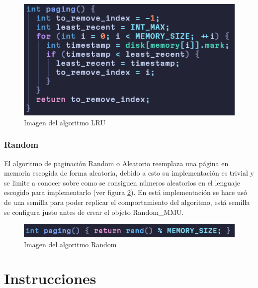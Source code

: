 \documentclass{report}
\begin{document}
\begin{figure}[h]
	\centering
	\includegraphics[width=0.8\linewidth]{figuras/lru.png}
	\caption{Imagen del algoritmo LRU }
	\label{fig:lru}
\end{figure}
  

\subsection{Random}

El algoritmo de paginación Random o Aleatorio reemplaza una página en memoria escogida de forma aleatoria, debido a esto su implementación es trivial y se limite a conocer sobre como se consiguen números aleatorios en el lenguaje escogido para implementarlo (ver figura \ref{fig:random}). En está implementación se hace usó de una semilla para poder replicar el comportamiento del algoritmo, está semilla se configura justo antes de crear el objeto Random\_MMU.

\begin{figure}[h]
	\centering
	\includegraphics[width=0.8\linewidth]{figuras/random.png}
	\caption{Imagen del algoritmo Random }
	\label{fig:random}
\end{figure}



\chapter{Instrucciones}
\end{document}

